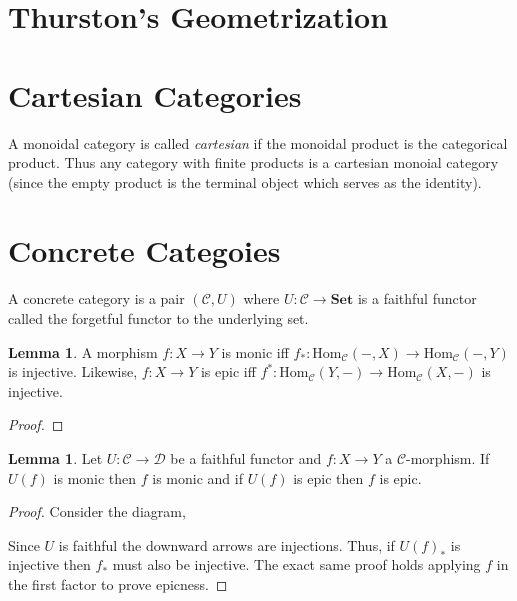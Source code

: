 \documentclass[12pt]{extarticle}
\newcommand{\Hom}[3]{\mathrm{Hom}_{#1}\left( #2, #3 \right)}
\newcommand{\Set}{\mathbf{Set}}
\theoremstyle{definition}
\newtheorem{lemma}[theorem]{Lemma}
\newenvironment{definition}[1][Definition:]{\begin{trivlist}
\item[\hskip \labelsep {\bfseries #1}]}{\end{trivlist}}
\newcommand{\C}{\mathbb{C}}
\begin{document}
\section{Thurston's Geometrization}


\section{Cartesian Categories}

\begin{definition}
A monoidal category is called \textit{cartesian} if the monoidal product is the categorical product. Thus any category with finite products is a cartesian monoial category (since the empty product is the terminal object which serves as the identity). 
\end{definition}


\section{Concrete Categoies}

\renewcommand{\C}{\mathcal{C}}
\newcommand{\D}{\mathcal{D}}

\begin{definition}
A concrete category is a pair $(\C, U)$ where $U : \C \to \Set$ is a faithful functor called the forgetful functor to the underlying set. 
\end{definition}

\begin{lemma}
A morphism $f : X \to Y$ is monic iff $f_* : \Hom{\C}{-}{X} \to \Hom{\C}{-}{Y}$ is injective. Likewise, $f : X \to Y$ is epic iff $f^* : \Hom{\C}{Y}{-} \to \Hom{\C}{X}{-}$ is injective. 
\end{lemma}

\begin{proof}

\end{proof}

\begin{lemma}
Let $U : \C \to \D$ be a faithful functor and $f : X \to Y$ a $\C$-morphism. If $U(f)$ is monic then $f$ is monic and if $U(f)$ is epic then $f$ is epic.
\end{lemma}

\begin{proof}
Consider the diagram,
\begin{center}
\end{center}
Since $U$ is faithful the downward arrows are injections. Thus, if $U(f)_*$ is injective then $f_*$ must also be injective. The exact same proof holds applying $f$ in the first factor to prove epicness.
\end{proof}
\end{document}
